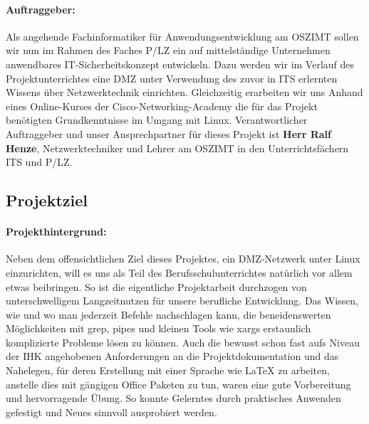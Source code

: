 \paragraph*{Auftraggeber: } Als angehende Fachinformatiker für Anwendungsentwicklung am \ac{OSZIMT} sollen wir nun im Rahmen des Faches \ac{P/LZ} ein auf mittelständige Unternehmen anwendbares \ac{IT}-Sicherheitskonzept entwickeln. Dazu werden wir im Verlauf des Projektunterrichtes eine \ac{DMZ} unter Verwendung des zuvor in \ac{ITS} erlernten Wissens über Netzwerktechnik einrichten. Gleichzeitig erarbeiten wir uns Anhand eines Online-Kurses der Cisco-Networking-Academy die für das Projekt benötigten Grundkenntnisse im Umgang mit Linux. Verantwortlicher Auftraggeber und unser Ansprechpartner für dieses Projekt ist \textbf{Herr Ralf Henze}, Netzwerktechniker und Lehrer am \ac{OSZIMT} in den Unterrichtsfächern \ac{ITS} und \ac{P/LZ}.

\subsection{Projektziel} 
\label{sec:Projektziel}
\paragraph*{Projekthintergrund: } Neben dem offensichtlichen Ziel dieses Projektes, ein \ac{DMZ}-Netzwerk unter Linux einzurichten, will es uns als Teil des Berufsschulunterrichtes natürlich vor allem etwas beibringen. So ist die eigentliche Projektarbeit durchzogen von unterschwelligem Langzeitnutzen für unsere berufliche Entwicklung. Das Wissen, wie und wo man jederzeit Befehle nachschlagen kann, die beneidenswerten Möglichkeiten mit grep, pipes und kleinen Tools wie xargs erstaunlich komplizierte Probleme lösen zu können. Auch die bewusst schon fast aufs Niveau der \ac{IHK} angehobenen Anforderungen an die Projektdokumentation und das Nahelegen, für deren Erstellung mit einer Sprache wie \LaTeX{} zu arbeiten, anstelle dies mit gängigen Office Paketen zu tun, waren eine gute Vorbereitung und hervorragende Übung. So konnte Gelerntes durch praktisches Anwenden gefestigt und Neues sinnvoll ausprobiert werden. 
